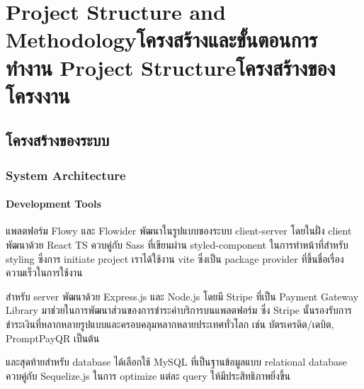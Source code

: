 \chapter{\ifproject%
\ifenglish Project Structure and Methodology\else โครงสร้างและขั้นตอนการทำงาน\fi
\else%
\ifenglish Project Structure\else โครงสร้างของโครงงาน\fi
\fi
}

\section{โครงสร้างของระบบ}
\subsection{System Architecture}
\subsubsection{Development Tools}
แพลตฟอร์ม Flowy และ Flowider พัฒนาในรูปแบบของระบบ client-server โดยในฝั่ง client พัฒนาด้วย React TS ควบคู่กับ Sass ที่เขียนผ่าน styled-component ในการทำหน้าที่สำหรับ styling ซึ่งการ initiate project เราได้ใช้งาน vite ซึ่งเป็น package provider ที่ขึ้นชื่อเรื่องความเร็วในการใช้งาน

สำหรับ server พัฒนาด้วย Express.js และ Node.js โดยมี Stripe ที่เป็น Payment Gateway Library มาช่วยในการพัฒนาส่วนของการชำระค่าบริการบนแพลตฟอร์ม ซึ่ง Stripe นั้นรองรับการชำระเงินที่หลากหลายรูปแบบและครอบคลุมหลากหลายประเทศทั่วโลก เช่น บัตรเครดิต/เดบิต, PromptPayQR เป็นต้น

และสุดท้ายสำหรับ database ได้เลือกใช้  MySQL ที่เป็นฐานข้อมูลแบบ relational database ควบคู่กับ Sequelize.js ในการ optimize แต่ละ query ให้มีประสิทธิภาพยิ่งขึ้น


